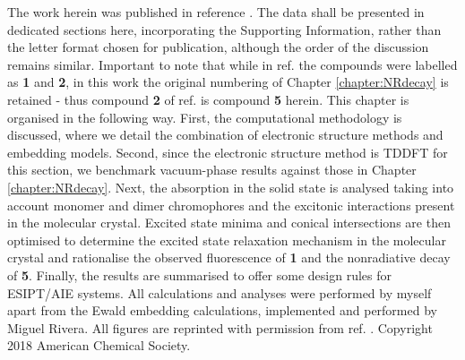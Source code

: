 The work herein was published in reference . The data shall be presented in dedicated sections here, incorporating the Supporting Information, rather than the letter format chosen for publication, although the order of the discussion remains similar. Important to note that while in ref.  the compounds were labelled as \textbf{1} and \textbf{2}, in this work the original numbering of Chapter \ref{chapter:NRdecay} is retained - thus compound \textbf{2} of ref.  is compound \textbf{5} herein. This chapter is organised in the following way. First, the computational methodology is discussed, where we detail the combination of electronic structure methods and embedding models. Second, since the electronic structure method is \ac{TDDFT} for this section, we benchmark vacuum-phase results against those in Chapter \ref{chapter:NRdecay}. Next, the absorption in the solid state is analysed taking into account monomer and dimer chromophores and the excitonic interactions present in the molecular crystal. Excited state minima and conical intersections are then optimised to determine the excited state relaxation mechanism in the molecular crystal and rationalise the observed fluorescence of \textbf{1} and the nonradiative decay of \textbf{5}. Finally, the results are summarised to offer some design rules for ESIPT/AIE systems. All calculations and analyses were performed by myself apart from the Ewald embedding calculations, implemented and performed by Miguel Rivera. All figures are reprinted with permission from ref. . Copyright 2018 American Chemical Society.
